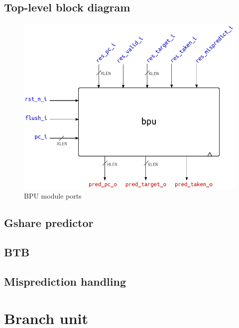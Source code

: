 \subsection{Top-level block diagram}
\begin{figure}[hbt]
  \centering
  \includegraphics[width=.9\textwidth]{img/bpu-top.pdf}
  \caption{\acs{BPU} module ports}
  \label{fig:bpu-top}
\end{figure}

\subsection{Gshare predictor}\label{sec:gshare}

\subsection{\acf{BTB}}\label{sec:btb}

\subsection{Misprediction handling}

\section{Branch unit}